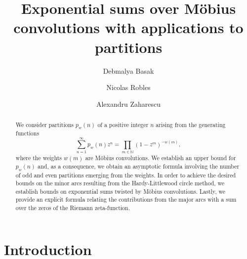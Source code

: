 \documentclass[11pt]{amsart}
\numberwithin{equation}{section}
\numberwithin{figure}{section}
\theoremstyle{definition}
\begin{document}
\title[Exponential sums over M\"{o}bius functions with partitions]{Exponential sums over M\"{o}bius convolutions with applications to partitions}
 \author[D.~Basak]{Debmalya Basak}
\address{Debmalya Basak: Department of Mathematics, University of Illinois, 1409 West Green Street, Urbana, IL 61801, USA}
\author[N.~Robles]{Nicolas Robles}
\address{Nicolas Robles: RAND Corporation, Engineering and Applied Sciences, 1200 S Hayes, Arlington, VA 22202, USA}
\author[A.~Zaharescu]{Alexandru Zaharescu}
\address{Alexandru Zaharescu: Department of Mathematics, University of Illinois, 1409 West Green
Street, Urbana, IL 61801, USA; \textnormal{and} Institute of Mathematics of the Romanian Academy, P.O. BOX 1-764, Bucharest, Ro-70700, Romania}
\maketitle
\begin{abstract}
We consider partitions $p_{w}(n)$ of a positive integer $n$ arising from the generating functions
\[\sum_{n=1}^\infty p_{w}(n) z^n =  \prod_{m \in \mathbb{N}} (1-z^m)^{-w(m)},
\]
where the weights $w(m)$ are M\"{o}bius convolutions. We establish an upper bound for $p_w(n)$ and, as a consequence, we obtain an asymptotic formula involving the number of odd and even partitions emerging from the weights. In order to achieve the desired bounds on the minor arcs resulting from the Hardy-Littlewood circle method, we establish bounds on exponential sums twisted by M\"{o}bius convolutions. Lastly, we provide an explicit formula relating the contributions from the major arcs with a sum over the zeros of the Riemann zeta-function. 
\end{abstract}
\section{Introduction} \label{sec:introduction}
\end{document}
